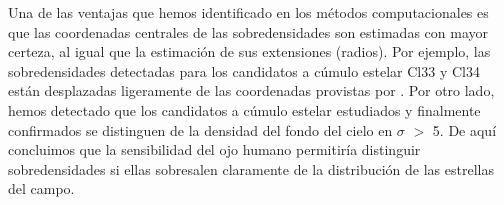 \documentclass[baaa]{baaa}
\begin{document}

\par 
Una de las ventajas que hemos identificado en los métodos computacionales es que las coordenadas centrales de las sobredensidades son estimadas con mayor certeza, al igual que la estimación de sus extensiones (radios). Por ejemplo, las sobredensidades detectadas para los candidatos a cúmulo estelar Cl33 y Cl34 están desplazadas ligeramente de las coordenadas provistas por \cite{borissova2011new}. Por otro lado, hemos detectado que los candidatos a cúmulo estelar estudiados y finalmente confirmados se distinguen de la densidad del fondo del cielo en $\sigma$ $>$ 5. De aquí concluimos que la sensibilidad del ojo humano permitiría distinguir sobredensidades si ellas sobresalen claramente de la distribución de las estrellas del campo.
\par

\end{document}
